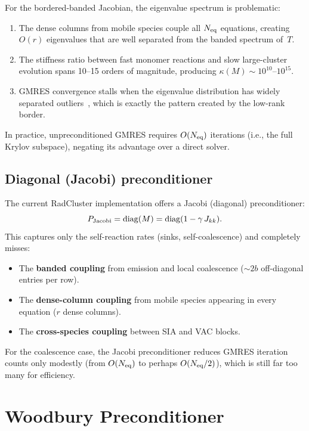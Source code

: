 \documentclass[11pt]{article}
\newcommand{\Neq}{N_{\rm eq}}
\newcommand{\bw}{b}
\newcommand{\rank}{r}
\DeclareMathOperator{\diag}{diag}
\begin{document}
For the bordered-banded Jacobian, the eigenvalue spectrum is
problematic:
\begin{enumerate}
  \item The dense columns from mobile species couple all $\Neq$
    equations, creating $O(\rank)$ eigenvalues that are well separated
    from the banded spectrum of~$T$.
  \item The stiffness ratio between fast monomer reactions and slow
    large-cluster evolution spans 10--15 orders of magnitude,
    producing $\kappa(M) \sim 10^{10}$--$10^{15}$.
  \item GMRES convergence stalls when the eigenvalue distribution has
    widely separated outliers~\cite{Saad2003}, which is exactly the
    pattern created by the low-rank border.
\end{enumerate}

In practice, unpreconditioned GMRES requires $O(\Neq)$ iterations
(i.e., the full Krylov subspace), negating its advantage over a direct
solver.

\subsection{Diagonal (Jacobi) preconditioner}

The current RadCluster implementation offers a Jacobi (diagonal)
preconditioner:
\begin{equation}
  P_{\rm Jacobi} = \diag(M) = \diag(1 - \gamma\,J_{kk}).
  \label{eq:jacobi}
\end{equation}
This captures only the self-reaction rates (sinks, self-coalescence)
and completely misses:
\begin{itemize}
  \item The \textbf{banded coupling} from emission and local
    coalescence ($\sim 2\bw$ off-diagonal entries per row).
  \item The \textbf{dense-column coupling} from mobile species
    appearing in every equation ($\rank$ dense columns).
  \item The \textbf{cross-species coupling} between SIA and VAC
    blocks.
\end{itemize}

For the coalescence case, the Jacobi preconditioner reduces GMRES
iteration counts only modestly (from $O(\Neq)$ to perhaps
$O(\Neq/2)$), which is still far too many for efficiency.

\section{Woodbury Preconditioner}
\label{sec:woodbury}
\end{document}
